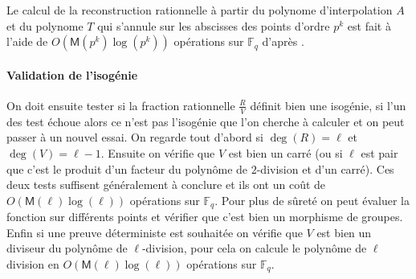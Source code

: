 \documentclass[10pt,a4paper]{book}
\theoremstyle{plain}
\theoremstyle{definition}
\newtheorem{lem}[thm]{Lemme}
\theoremstyle{definition}
\theoremstyle{definition}
\theoremstyle{definition}
\theoremstyle{remark}
\theoremstyle{remark}
\begin{document}
Le calcul de la reconstruction rationnelle à partir du polynome d'interpolation $A$ et du polynome $T$ qui s'annule sur les abscisses des points d'ordre $p^k$ est fait à l'aide de $O(\mathsf{M}(p^{k})\log(p^k))$ opérations sur $\mathbb{F}_q$ d'après \cite[§ 11.1]{vzGJG03}.

%

\paragraph{Validation de l'isogénie} On doit ensuite tester si la fraction rationnelle $\frac{R}{V}$ définit bien une isogénie, si l'un des test échoue alors ce n'est pas l'isogénie que l'on cherche à calculer et on peut passer à un nouvel essai. On regarde tout d'abord si $\deg(R)=\ell$ et $\deg(V)=\ell-1$. Ensuite on vérifie que $V$ est bien un carré (ou si $\ell$ est pair que c'est le produit d'un facteur du polynôme de $2$-division et d'un carré). Ces deux tests suffisent généralement à conclure et ils ont un coût de $O(\mathsf{M}(\ell) \log(\ell))$ opérations sur $\mathbb{F}_q$. Pour plus de sûreté on peut évaluer la fonction sur différents points et vérifier que c'est bien un morphisme de groupes. Enfin si une preuve déterministe est souhaitée on vérifie que $V$ est bien un diviseur du polynôme de $\ell$-division, pour cela on calcule le polynôme de $\ell$ division en $O(\mathsf{M}(\ell)\log(\ell))$ opérations sur $\mathbb{F}_q$. 
\end{document}
